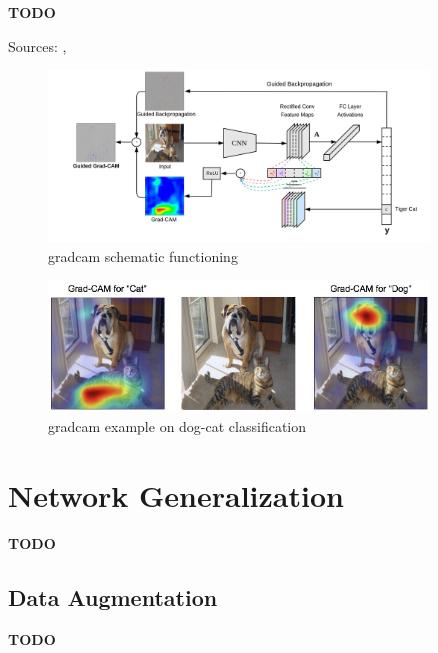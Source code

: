\textbf{TODO}

Sources: \cite{Selvaraju_2019}, \cite{gradcam_medium}

\begin{figure}[!htb]
	\centering
	\includegraphics[width=0.9\textwidth]{"contents/images/gradcam/02-gradcam-schema"}
	\caption[\gls{gradcam} schematic functioning]{\gls{gradcam} schematic functioning \cite{Selvaraju_2019}}
	\label{fig:gradcam-schema}
\end{figure}

\begin{figure}[!htb]
\centering
\includegraphics[width=0.9\textwidth]{"contents/images/gradcam/02-gradcam-catdog"}
\caption[\gls{gradcam} example on dog-cat classification]{\gls{gradcam} example on dog-cat classification \cite{Selvaraju_2019}}
\label{fig:gradcam-catdog}
\end{figure}




\section{Network Generalization}
\label{sec:network-generalization}

\textbf{TODO}



\subsection{Data Augmentation}
\label{subsec:data-augmentation}

\textbf{TODO}

